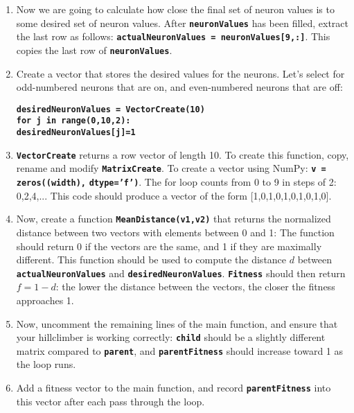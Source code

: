 \documentclass[12pt]{article}
\begin{document}
\begin{enumerate}
\item Now we are going to calculate how close the final set of neuron values is to some desired set of neuron values. After \textbf{\texttt{neuronValues}} has been filled, extract the last row as follows: \textbf{\texttt{actualNeuronValues = neuronValues[9,:]}}. This copies the last row of \textbf{\texttt{neuronValues}}.

\item Create a vector that stores the desired values for the neurons. Let's select for odd-numbered neurons that are on, and even-numbered neurons that are off:

\textbf{\texttt{desiredNeuronValues = VectorCreate(10)}}\\
\textbf{\texttt{for j in range(0,10,2):}}\\
\indent \textbf{\texttt{\hspace{1cm}desiredNeuronValues[j]=1}}\\

\item \textbf{\texttt{VectorCreate}} returns a row vector of length 10. To create this function, copy, rename and modify \textbf{\texttt{MatrixCreate}}. To create a vector using NumPy: \textbf{\texttt{v = zeros((width),}} \textbf{\texttt{dtype='f')}}. The for loop counts from 0 to 9 in steps of 2: 0,2,4,... This code should produce a vector of the form [1,0,1,0,1,0,1,0,1,0].

\item Now, create a function \textbf{\texttt{MeanDistance(v1,v2)}} that returns the normalized distance between two vectors with elements between 0 and 1: The function should return 0 if the vectors are the same, and 1 if they are maximally different. This function should be used to compute the distance $d$ between \textbf{\texttt{actualNeuronValues}} and \textbf{\texttt{desiredNeuronValues}}. \textbf{\texttt{Fitness}} should then return $f=1-d$: the lower the distance between the vectors, the closer the fitness approaches 1.

\item Now, uncomment the remaining lines of the main function, and ensure that your hillclimber is working correctly: \textbf{\texttt{child}} should be a slightly different matrix compared to \textbf{\texttt{parent}}, and \textbf{\texttt{parentFitness}} should increase toward 1 as the loop runs.

\item Add a fitness vector to the main function, and record \textbf{\texttt{parentFitness}} into this vector after each pass through the loop.


\end{enumerate}
\end{document}
